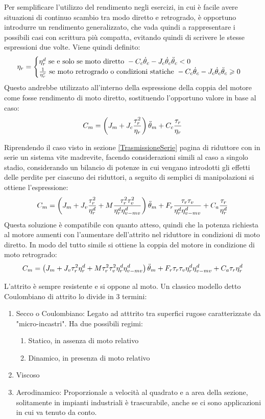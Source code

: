 Per semplificare l'utilizzo del rendimento negli esercizi, in cui è facile avere situazioni di continuo scambio tra modo diretto e retrogrado, è opportuno introdurre un rendimento generalizzato, che vada quindi a rappresentare i possibili casi con scrittura più compatta, evitando quindi di scrivere le stesse espressioni due volte.
Viene quindi definito:
\[
\eta_r = 
\begin{cases}
    \eta_r^d \text{ se e solo se moto diretto } -C_c\dot{\theta}_c - J_c \dot{\theta}_c\Ddot{\theta}_c < 0 \\
    \frac{1}{\eta_r^r} \text{ se moto retrogrado o condizioni statiche } -C_c\dot{\theta}_c - J_c \dot{\theta}_c\Ddot{\theta}_c \geqslant 0
\end{cases}
\]
Questo andrebbe utilizzato all'interno della espressione della coppia del motore come fosse rendimento di moto diretto, sostituendo l'opportuno valore in base al caso:
\[
C_m = \left(J_m+J_c\frac{\tau^2_r}{\eta_r}\right) \Ddot{\theta}_m + C_c\frac{\tau_r}{\eta_r}
\]

Riprendendo il caso visto in sezione \ref{TrasmissioneSerie} pagina \pageref{TrasmissioneSerie} di riduttore con in serie un sistema vite madrevite, facendo considerazioni simili al caso a singolo stadio, considerando un bilancio di potenze in cui vengano introdotti gli effetti delle perdite per ciascuno dei riduttori, a seguito di semplici di manipolazioni si ottiene l'espressione:
\[
C_m=\left(J_m+J_v \frac{\tau^2_r}{\eta_r^d} + M \frac{\tau_r^2 \tau_v^2}{\eta_r^d \eta^d_{v-mv}}\right)\Ddot{\theta}_m + F_r \frac{\tau_r \tau_v}{\eta_r^d \eta^d_{v-mv}} + C_a \frac{\tau_r}{\eta_r^d}
\]
Questa soluzione è compatibile con quanto atteso, quindi che la potenza richiesta al motore aumenti con l'aumentare dell'attrito nel riduttore in condizioni di moto diretto.
In modo del tutto simile si ottiene la coppia del motore in condizione di moto retrogrado:
\[
C_m=\left(J_m+J_v \tau^2_r\eta_r^d + M \tau_r^2 \tau_v^2\eta_r^d \eta^d_{v-mv}\right)\Ddot{\theta}_m + F_r \tau_r \tau_v\eta_r^d \eta^d_{v-mv} + C_a \tau_r\eta_r^d
\]

L'attrito è sempre resistente e si oppone al moto.
Un classico modello detto Coulombiano di attrito lo divide in 3 termini:
\begin{enumerate}
    \item Secco o Coulombiano: Legato ad atttrito tra superfici rugose caratterizzate da "micro-incastri". Ha due possibili regimi:
    \begin{enumerate}
        \item Statico, in assenza di moto relativo
        \item Dinamico, in presenza di moto relativo
    \end{enumerate}
    \item Viscoso
    \item Aerodinamico: Proporzionale a velocità al quadrato e a area della sezione, solitamente in impianti industriali è trascurabile, anche se ci sono applicazioni in cui va tenuto da conto.
\end{enumerate}

